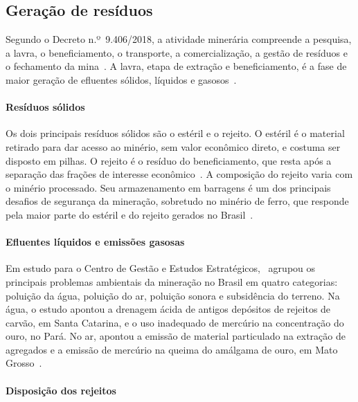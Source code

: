 \subsection{Geração de resíduos}
\label{subsec:geracao_residuos}

Segundo o Decreto n.º~9.406/2018, a atividade minerária compreende a
pesquisa, a lavra, o beneficiamento, o transporte, a comercialização, a
gestão de resíduos e o fechamento da mina~\cite{brasil2018}. A lavra,
etapa de extração e beneficiamento, é a fase de maior geração de
efluentes sólidos, líquidos e gasosos~\cite{carvalho2018, freire2020}.

\paragraph*{Resíduos sólidos}

Os dois principais resíduos sólidos são o estéril e o rejeito. O estéril
é o material retirado para dar acesso ao minério, sem valor econômico
direto, e costuma ser disposto em pilhas. O rejeito é o resíduo do
beneficiamento, que resta após a separação das frações de interesse
econômico~\cite{carvalho2018, freire2020}.
A composição do rejeito varia com o minério processado. Seu
armazenamento em barragens é um dos principais desafios de segurança
da mineração, sobretudo no minério de ferro, que responde pela maior
parte do estéril e do rejeito gerados no Brasil~\cite{carvalho2018, freire2020}.

\paragraph*{Efluentes líquidos e emissões gasosas}

Em estudo para o Centro de Gestão e Estudos Estratégicos,~ agrupou os principais problemas
ambientais da mineração no Brasil em quatro categorias: poluição da
água, poluição do ar, poluição sonora e subsidência do terreno.
Na água, o estudo apontou a drenagem ácida de antigos depósitos de
rejeitos de carvão, em Santa Catarina, e o uso inadequado de mercúrio na
concentração do ouro, no Pará. No ar, apontou a emissão de material
particulado na extração de agregados e a emissão de mercúrio na queima
do amálgama de ouro, em Mato Grosso~\cite[p.~16]{farias2002mineracao}.

\paragraph*{Disposição dos rejeitos}

